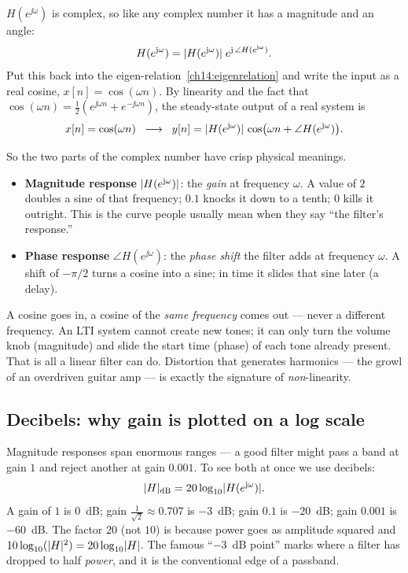$H(e^{\jj\omega})$ is complex, so like any complex number it has a magnitude and
an angle:
\[
  H(e^{\mathrm{j}\omega}) = \lvert H(e^{\mathrm{j}\omega})\rvert\; e^{\mathrm{j}\,\angle H(e^{\mathrm{j}\omega})}.
\]
Put this back into the eigen-relation~\eqref{ch14:eigenrelation} and write the
input as a real cosine, $x[n] = \cos(\omega n)$. By linearity and the fact that
$\cos(\omega n) = \tfrac12(e^{\jj\omega n} + e^{-\jj\omega n})$, the steady-state
output of a real system is
\begin{equation}
  x[n] = \cos(\omega n) \;\;\longrightarrow\;\;
  y[n] = \lvert H(e^{\mathrm{j}\omega})\rvert\,\cos\!\big(\omega n + \angle H(e^{\mathrm{j}\omega})\big).
  \label{ch14:cosinout}
\end{equation}

So the two parts of the complex number have crisp physical meanings.

\begin{itemize}
  \item \textbf{Magnitude response} $\lvert H(e^{\mathrm{j}\omega})\rvert$: the \emph{gain} at
  frequency $\omega$. A value of $2$ doubles a sine of that frequency; $0.1$
  knocks it down to a tenth; $0$ kills it outright. This is the curve people
  usually mean when they say ``the filter's response.''
  \item \textbf{Phase response} $\angle H(e^{\jj\omega})$: the \emph{phase shift}
  the filter adds at frequency $\omega$. A shift of $-\pi/2$ turns a cosine into
  a sine; in time it slides that sine later (a delay).
\end{itemize}

\begin{intuitionbox}
A cosine goes in, a cosine of the \emph{same frequency} comes out --- never a
different frequency. An LTI system cannot create new tones; it can only turn the
volume knob (magnitude) and slide the start time (phase) of each tone already
present. That is all a linear filter can do. Distortion that
generates harmonics --- the growl of an overdriven guitar amp --- is exactly the
signature of \emph{non}-linearity.
\end{intuitionbox}

\subsection{Decibels: why gain is plotted on a log scale}

Magnitude responses span enormous ranges --- a good filter might pass a band at
gain $1$ and reject another at gain $0.001$. To see both at once we use
decibels:
\[
  \lvert H\rvert_{\text{dB}} = 20\log_{10}\lvert H(e^{\mathrm{j}\omega})\rvert.
\]
A gain of $1$ is $0$~dB; gain $\tfrac{1}{\sqrt2}\approx 0.707$ is $-3$~dB; gain
$0.1$ is $-20$~dB; gain $0.001$ is $-60$~dB. The factor $20$ (not $10$) is
because power goes as amplitude squared and
$10\log_{10}(\lvert H\rvert^2)=20\log_{10}\lvert H\rvert$. The famous ``$-3$~dB point'' marks
where a filter has dropped to half \emph{power}, and it is the conventional edge
of a passband.

